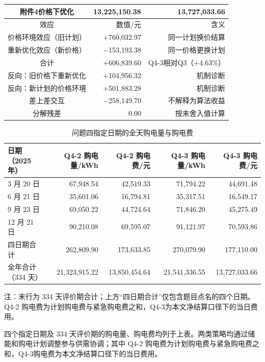 \documentclass[withoutpreface,bwprint]{cumcmthesis}
\begin{document}
\begin{table}[!htbp]
\begin{tabular}{|c|r|r|}
\hline
附件4价格下优化 & 13,225,150.38 & 13,727,033.66 \\
\hline
效应 & 数值/元 & 含义 \\
\hline
价格环境效应（旧计划） & +760,032.97 & 同一计划换价结算 \\
\hline
重新优化效应（新价格） & $-$153,193.38 & 同一价格更换计划 \\
\hline
合计 & +606,839.60 & Q4-3相对Q3（+4.63\%） \\
\hline
反向：旧价格下重新优化 & +104,956.32 & 机制诊断 \\
\hline
反向：新计划的价格环境 & +501,883.28 & 机制诊断 \\
\hline
差上差交互 & $-$258,149.70 & 不解释为算法收益 \\
\hline
分解残差 & 0.00 & 按未舍入值计算 \\
\hline
\end{tabular}\end{table}

\begin{table}[!htbp]
\centering
\caption{问题四指定日期的全天购电量与购电费}
\footnotesize
\setlength{\tabcolsep}{4pt}
\begin{tabular}{|l|r|r|r|r|}
\hline
日期（2025 年） & Q4-2 购电量/kWh & Q4-2 购电费/元 & Q4-3 购电量/kWh & Q4-3 购电费/元 \\
\hline
3 月 20 日 & 67,948.54 & 42,519.33 & 71,794.22 & 44,691.48 \\
\hline
6 月 21 日 & 35,601.06 & 16,794.81 & 35,317.51 & 16,549.17 \\
\hline
9 月 23 日 & 69,050.22 & 44,724.64 & 71,846.20 & 45,275.49 \\
\hline
12 月 21 日 & 90,210.08 & 69,595.07 & 91,121.97 & 70,593.86 \\
\hline
四日期合计 & 262,809.90 & 173,633.85 & 270,079.90 & 177,110.00 \\
\hline
全年合计（334 天） & 21,323,915.22 & 13,850,454.64 & 21,541,336.55 & 13,727,033.66 \\
\hline
\end{tabular}
\vspace{2pt}
\begin{flushleft}\footnotesize 注：末行为 334 天评价期合计；上方“四日期合计”仅包含题目点名的四个日期。Q4-2 购电费为计划购电费与紧急购电费之和，Q4-3为本文净结算口径下的当日费用。\end{flushleft}
\end{table}


四个指定日期及 334 天评价期的购电量、购电费均列于上表。两类策略均通过储能和购电计划调整参与供需协调；其中 Q4-2 购电费为计划购电费与紧急购电费之和，Q4-3购电费为本文净结算口径下的当日费用。
\end{document}
